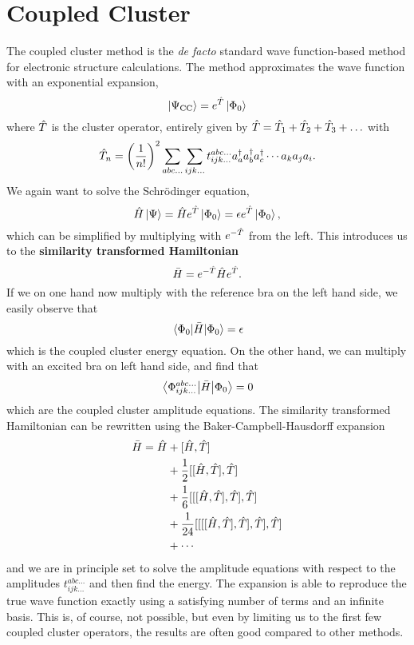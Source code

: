 \section{Coupled Cluster} \label{subsec:cc}
The coupled cluster method is the \textit{de facto} standard wave function-based method for electronic structure calculations. \cite{paldus} The method approximates the wave function with an exponential expansion, 
\begin{equation}
\ket{\Psi_{\text{CC}}}=e^{\hat{T}}\ket{\Phi_0}
\end{equation}
where $\hat{T}$ is the cluster operator, entirely given by $\hat{T}=\hat{T}_1+\hat{T}_2 +\hat{T}_3+\hdots$ with
\begin{equation}
\hat{T}_n = \left( \frac{1}{n!}\right)^2 \sum_{abc...} \sum_{ijk...} t_{ijk...}^{abc...}a_a^\dagger a_b^\dagger a_c^\dagger \cdots a_k a_j a_i.
\end{equation}
We again want to solve the Schrödinger equation,
\begin{equation}
\hat{H}\ket{\Psi}=\hat{H}e^{\hatT}\ket{\Phi_0}=\epsilon e^{\hatT}\ket{\Phi_0},
\end{equation}
which can be simplified by multiplying with $e^{-\hat{T}}$ from the left. This introduces us to the \textbf{similarity transformed Hamiltonian} 
\begin{equation}
\bar{H}=e^{-\hat{T}}\hat{H}e^{\hat{T}}.
\end{equation}
If we on one hand now multiply with the reference bra on the left hand side, we easily observe that
\begin{equation}
\mel{\Phi_0}{\bar{H}}{\Phi_0}=\epsilon
\end{equation}
which is the coupled cluster energy equation. On the other hand, we can multiply with an excited bra on left hand side, and find that
\begin{equation}
\mel{\Phi_{ijk\hdots}^{abc\hdots}}{\bar{H}}{\Phi_0}=0
\end{equation}
which are the coupled cluster amplitude equations. The similarity transformed Hamiltonian can be rewritten using the Baker-Campbell-Hausdorff expansion
\begin{align}
\label{eq:BCH}
\bar{H} = \hat{H} &+ [\hat{H},\hat{T}]\notag \\
&+ \frac{1}{2}[[\hat{H},\hat{T}],\hat{T}]\notag \\
&+ \frac{1}{6}[[[\hat{H},\hat{T}],\hat{T}],\hat{T}] \\
&+ \frac{1}{24}[[[[\hat{H},\hat{T}],\hat{T}],\hat{T}],\hat{T}] \notag \\
&+ \cdots \notag
\end{align}
and we are in principle set to solve the amplitude equations with respect to the amplitudes $t_{ijk\hdots}^{abc\hdots}$ and then find the energy. The expansion is able to reproduce the true wave function exactly using a satisfying number of terms and an infinite basis. This is, of course, not possible, but even by limiting us to the first few coupled cluster operators, the results are often good compared to other methods. \cite{crawford}